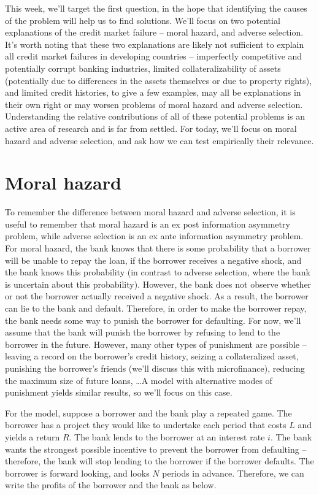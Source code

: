 \documentclass[12pt,english]{article}
\begin{document}
This week, we'll target the first question, in the hope that identifying the causes of the problem will help us to find solutions. We'll focus on two potential explanations of the credit market failure -- moral hazard, and adverse selection. It's worth noting that these two explanations are likely not sufficient to explain all credit market failures in developing countries -- imperfectly competitive and potentially corrupt banking industries, limited collateralizability of assets (potentially due to differences in the assets themselves or due to property rights), and limited credit histories, to give a few examples, may all be explanations in their own right or may worsen problems of moral hazard and adverse selection. Understanding the relative contributions of all of these potential problems is an active area of research and is far from settled. For today, we'll focus on moral hazard and adverse selection, and ask how we can test empirically their relevance.

\section{Moral hazard}

To remember the difference between moral hazard and adverse selection, it is useful to remember that moral hazard is an ex post information asymmetry problem, while adverse selection is an ex ante information asymmetry problem. For moral hazard, the bank knows that there is some probability that a borrower will be unable to repay the loan, if the borrower receives a negative shock, and the bank knows this probability (in contrast to adverse selection, where the bank is uncertain about this probability). However, the bank does not observe whether or not the borrower actually received a negative shock. As a result, the borrower can lie to the bank and default. Therefore, in order to make the borrower repay, the bank needs some way to punish the borrower for defaulting. For now, we'll assume that the bank will punish the borrower by refusing to lend to the borrower in the future. However, many other types of punishment are possible -- leaving a record on the borrower's credit history, seizing a collateralized asset, punishing the borrower's friends (we'll discuss this with microfinance), reducing the maximum size of future loans, \ldots A model with alternative modes of punishment yields similar results, so we'll focus on this case.

For the model, suppose a borrower and the bank play a repeated game. The borrower has a project they would like to undertake each period that costs $L$ and yields a return $R$. The bank lends to the borrower at an interest rate $i$. The bank wants the strongest possible incentive to prevent the borrower from defaulting -- therefore, the bank will stop lending to the borrower if the borrower defaults. The borrower is forward looking, and looks $N$ periods in advance. Therefore, we can write the profits of the borrower and the bank as below.
\end{document}
